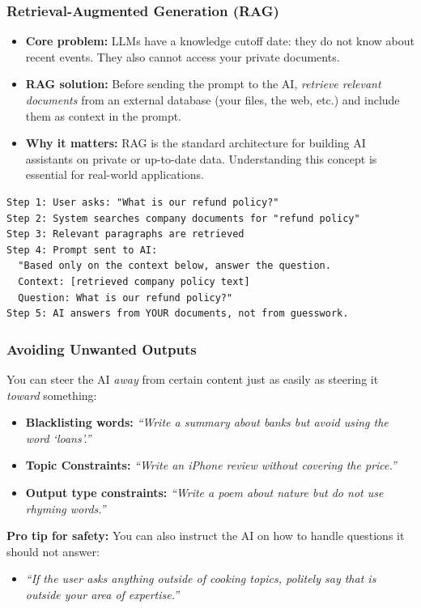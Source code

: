 \begin{frame}[fragile]\frametitle{Retrieval-Augmented Generation (RAG)}

\begin{itemize}
\item \textbf{Core problem:} LLMs have a knowledge cutoff date: they do not know about recent events. They also cannot access your private documents.
\item \textbf{RAG solution:} Before sending the prompt to the AI, \emph{retrieve relevant documents} from an external database (your files, the web, etc.) and include them as context in the prompt.
\item \textbf{Why it matters:} RAG is the standard architecture for building AI assistants on private or up-to-date data. Understanding this concept is essential for real-world applications.

\end{itemize}

\begin{lstlisting}[language=HTML]
Step 1: User asks: "What is our refund policy?"
Step 2: System searches company documents for "refund policy"
Step 3: Relevant paragraphs are retrieved
Step 4: Prompt sent to AI:
  "Based only on the context below, answer the question.
  Context: [retrieved company policy text]
  Question: What is our refund policy?"
Step 5: AI answers from YOUR documents, not from guesswork.
\end{lstlisting}


\end{frame}


\begin{frame}[fragile]\frametitle{Avoiding Unwanted Outputs}

You can steer the AI \emph{away} from certain content just as easily as steering it \emph{toward} something:

\begin{itemize}
\item \textbf{Blacklisting words:} \emph{``Write a summary about banks but avoid using the word `loans'.''} 
\item \textbf{Topic Constraints:} \emph{``Write an iPhone review without covering the price.''}
\item \textbf{Output type constraints:} \emph{``Write a poem about nature but do not use rhyming words.''}
\end{itemize}

\medskip
\textbf{Pro tip for safety:} You can also instruct the AI on how to handle questions it should not answer:
\begin{itemize}
\item \emph{``If the user asks anything outside of cooking topics, politely say that is outside your area of expertise.''}
\end{itemize}


\end{frame}


